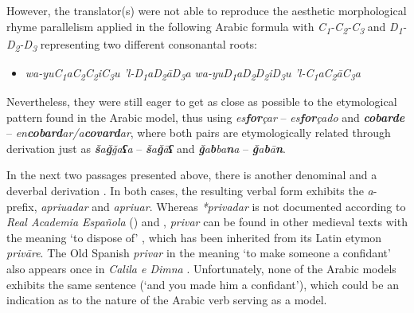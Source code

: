 \documentclass[output=paper]{langscibook}
\begin{document}
However, the translator(s) were not able to reproduce the aesthetic morphological rhyme parallelism applied in the following Arabic formula with \textit{C\textsubscript{1}-C\textsubscript{2}-C\textsubscript{3}} and \textit{D\textsubscript{1}-D\textsubscript{2}-D\textsubscript{3}} representing two different consonantal roots:

\begin{itemize}
\item[]\textit{wa-yuC\textsubscript{1}aC\textsubscript{2}C\textsubscript{2}iC\textsubscript{3}u ’l-D\textsubscript{1}aD\textsubscript{2}āD\textsubscript{3}a wa-yuD\textsubscript{1}aD\textsubscript{2}D\textsubscript{2}iD\textsubscript{3}u ’l-C\textsubscript{1}aC\textsubscript{2}āC\textsubscript{3}a}
\end{itemize}

Nevertheless, they were still eager to get as close as possible to the etymological pattern found in the Arabic model, thus using \textit{es\textbf{for}çar} – \textit{es\textbf{for}çado} and \textit{\textbf{cobarde}} – \textit{en\textbf{cobard}ar/a\textbf{covard}ar}, where both pairs are etymologically related through derivation just as \textit{\textbf{š}a\textbf{ǧ}ǧa\textbf{ʕ}a} – \textit{\textbf{š}a\textbf{ǧ}ā\textbf{ʕ}} and \textit{\textbf{ǧ}a\textbf{b}ba\textbf{n}a} – \textit{\textbf{ǧ}a\textbf{b}ā\textbf{n}}. 

In the next two passages presented above, there is another denominal  and a deverbal derivation . In both cases, the resulting verbal form exhibits the \textit{a}- prefix, \textit{apriuadar} and \textit{apriuar}. Whereas \textit{*privadar} is not documented according to \textit{Real Academia Española} (\citeyear{real_academia_espanola_banco_nodate}) and \citet{pharies_diccionario_2002}, \textit{privar} can be found in other medieval texts with the meaning ‘to dispose of’ \citep[569]{kasten_tentative_2001}, which has been inherited from its Latin etymon \textit{privāre}. The Old Spanish \textit{privar} in the meaning ‘to make someone a confidant’ also appears once in \textit{Calila e Dimna} \citep[AI.140b]{dohla_libro_2009}. Unfortunately, none of the Arabic models exhibits the same sentence (‘and you made him a confidant’), which could be an indication as to the nature of the Arabic verb serving as a model. 
\end{document}
